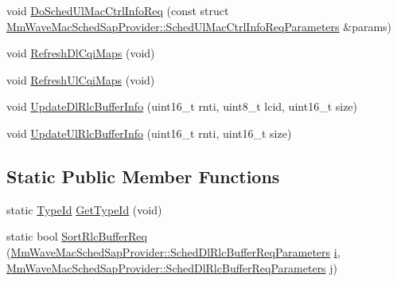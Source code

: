 \begin{DoxyCompactItemize}
\item 
void \hyperlink{classns3_1_1MmWaveRrMacScheduler_ab99149a6961ca02b605ce4c89c12e4c7}{Do\+Sched\+Ul\+Mac\+Ctrl\+Info\+Req} (const struct \hyperlink{structns3_1_1MmWaveMacSchedSapProvider_1_1SchedUlMacCtrlInfoReqParameters}{Mm\+Wave\+Mac\+Sched\+Sap\+Provider\+::\+Sched\+Ul\+Mac\+Ctrl\+Info\+Req\+Parameters} \&params)
\item 
void \hyperlink{classns3_1_1MmWaveRrMacScheduler_a7e934e11a18ac6fccd3eb11e41693523}{Refresh\+Dl\+Cqi\+Maps} (void)
\item 
void \hyperlink{classns3_1_1MmWaveRrMacScheduler_a08bd59d628f7a0115392e00c9cf44c59}{Refresh\+Ul\+Cqi\+Maps} (void)
\item 
void \hyperlink{classns3_1_1MmWaveRrMacScheduler_a005e51f10e6d477bf11d6993f081ed24}{Update\+Dl\+Rlc\+Buffer\+Info} (uint16\+\_\+t rnti, uint8\+\_\+t lcid, uint16\+\_\+t size)
\item 
void \hyperlink{classns3_1_1MmWaveRrMacScheduler_a57725a4bd9ba6cfe462d804a131c0255}{Update\+Ul\+Rlc\+Buffer\+Info} (uint16\+\_\+t rnti, uint16\+\_\+t size)
\end{DoxyCompactItemize}
\subsection*{Static Public Member Functions}
\begin{DoxyCompactItemize}
\item 
static \hyperlink{classns3_1_1TypeId}{Type\+Id} \hyperlink{classns3_1_1MmWaveRrMacScheduler_a9cc402ee93f6e866bfc290ad6bb3cc8d}{Get\+Type\+Id} (void)
\item 
static bool \hyperlink{classns3_1_1MmWaveRrMacScheduler_ae0fee4909466a1900ad3d92b6b6fe3e2}{Sort\+Rlc\+Buffer\+Req} (\hyperlink{structns3_1_1MmWaveMacSchedSapProvider_1_1SchedDlRlcBufferReqParameters}{Mm\+Wave\+Mac\+Sched\+Sap\+Provider\+::\+Sched\+Dl\+Rlc\+Buffer\+Req\+Parameters} \hyperlink{lte__uplink__power__control_8m_a6f6ccfcf58b31cb6412107d9d5281426}{i}, \hyperlink{structns3_1_1MmWaveMacSchedSapProvider_1_1SchedDlRlcBufferReqParameters}{Mm\+Wave\+Mac\+Sched\+Sap\+Provider\+::\+Sched\+Dl\+Rlc\+Buffer\+Req\+Parameters} j)
\end{DoxyCompactItemize}
